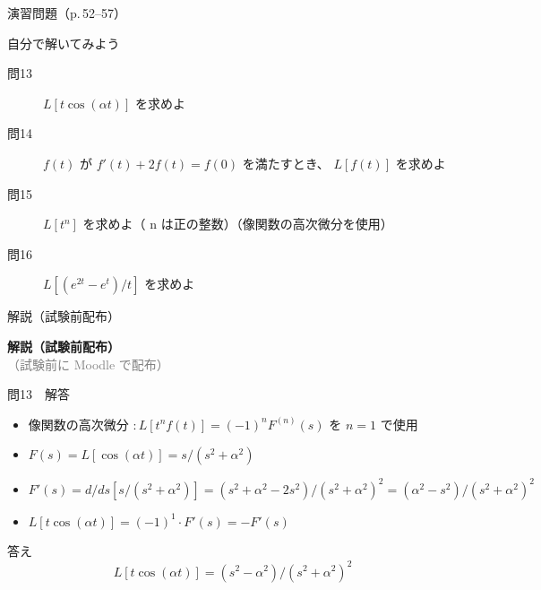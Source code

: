 \documentclass[aspectratio=43,professionalfonts,handout]{beamer}
\begin{document}
\begin{frame}{演習問題（p.\,52--57）}
  \begin{exampleblock}{自分で解いてみよう}
  \begin{description}
    \item[問13] $L[t \cos(\alpha t)]$ を求めよ
    \item[問14] $f(t)$ が $f'(t)+2f(t)=f(0)$ を満たすとき、 $L[f(t)]$ を求めよ
    \item[問15] $L[t^n]$ を求めよ（ n は正の整数）（像関数の高次微分を使用）
    \item[問16] $L[(e^{2t} - e^t)/t]$ を求めよ
  \end{description}
  \end{exampleblock}
\end{frame}

\begin{frame}{解説（試験前配布）}
  \vfill
  \begin{center}
  {\LARGE\bfseries\color{structure.fg} 解説（試験前配布）}\\[1em]
  {\normalsize\textcolor{gray}{（試験前に Moodle で配布）}}
  \end{center}
  \vfill
\end{frame}

\begin{frame}{問13　解答}
  \begin{block}{}
  \begin{itemize}\setlength{\itemsep}{2pt}
    \item 像関数の高次微分 $: L[t^n f(t)] = (-1)^n F^{(n)}(s)$ を $n=1$ で使用
    \item $F(s) = L[\cos(\alpha t)] = s/(s^{2}+\alpha^{2})$
    \item $F'(s) = d/ds [s/(s^{2}+\alpha^{2})] = (s^{2}+\alpha^{2}-2s^{2})/(s^{2}+\alpha^{2})^{2} = (\alpha^{2}-s^{2})/(s^{2}+\alpha^{2})^{2}$
    \item $L[t \cos(\alpha t)] = (-1)^{1}\cdot F'(s) = -F'(s)$
  \end{itemize}
  \end{block}
  \begin{exampleblock}{答え}
    \[
    L[t \cos(\alpha t)] = (s^{2}-\alpha^{2})/(s^{2}+\alpha^{2})^{2}
  \]
  \end{exampleblock}
\end{frame}
\end{document}
